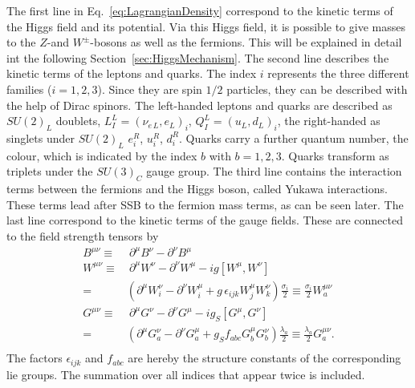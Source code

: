 The first line in Eq.~\eqref{eq:LagrangianDensity} correspond to the kinetic terms of the Higgs field and its potential.
Via this Higgs field, it is possible to give masses to the $Z$-and $W^{\pm}$-bosons as well as the fermions.
This will be explained in detail int the following Section~\ref{sec:HiggsMechanism}.
The second line describes the kinetic terms of the leptons and quarks.
The index $i$ represents the three different families ($i=1,2,3$).
Since they are spin $1/2$ particles, they can be described with the help of Dirac spinors.
The left-handed leptons and quarks are described as $SU(2)_L$ doublets, $L_I^L = \left( \nu_{e\,L},e_L\right)_i$, $Q_I^L = \left( u_{L},d_L\right)_i$,  the right-handed as singlets under $SU(2)_L$ $e_i^R$, $u_i^R$, $d_i^R$.
Quarks carry a further quantum number, the colour, which is indicated by the index $b$ with $b=1,2,3$.
Quarks transform as triplets under the $SU(3)_C$ gauge group.
The third line contains the interaction terms between the fermions and the Higgs boson, called Yukawa interactions.
These terms lead after SSB to the fermion mass terms, as can be seen later.
The last line correspond to the kinetic terms of the gauge fields.
These are connected to the field strength tensors by
\begin{equation}
 \begin{split}
  B^{\mu\nu} \equiv &\ \partial^{\mu} B^{\nu} - \partial^{\nu} B^{\mu}\\  
  W^{\mu\nu} \equiv &\ \partial^{\mu} W^{\nu} - \partial^{\nu} W^{\mu} -i g \left[W^{\mu}, W^{\nu} \right]\\
             =& \left( \partial^{\mu} W_i^{\nu} -\partial^{\nu} W_i^{\mu} + g\, \epsilon_{ijk} W_j^{\mu} W_k^{\nu}  \right) \frac{\sigma_i}{2} \equiv \frac{\sigma_i}{2} W_a^{\mu\nu}\\
  G^{\mu\nu} \equiv &\ \partial^{\mu} G^{\nu} - \partial^{\nu} G^{\mu} - i g_S \left[G^{\mu}, G^{\nu} \right] \\
            =& \left( \partial^{\mu} G_a^{\nu} -\partial^{\nu} G_a^{\mu} + g_S f_{abc} G_b^{\mu} G_b^{\nu}  \right) \frac{\lambda_a}{2} \equiv \frac{\lambda_a}{2} G_a^{\mu\nu}.\\
 \end{split}
\end{equation}
The factors $\epsilon_{ijk}$ and $f_{abc}$ are hereby the structure constants of the corresponding lie groups.
The summation over all indices that appear twice is included.

